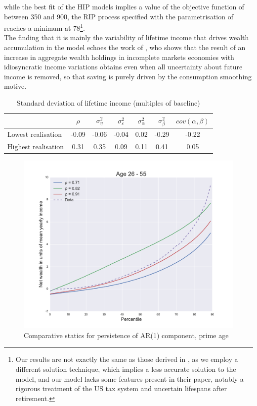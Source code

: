 while the best fit of the HIP models implies a value of the objective function
of between 350 and 900, the RIP process specified with the parametrisation of
\citet{HintermaierKoeniger2011} reaches a minimum at 78\footnote{Our results are
not exactly the same as those derived in \citet{HintermaierKoeniger2011}, as we 
employ a different solution technique, which implies a less accurate solution to 
the model, and our model lacks some features present in their paper, notably a
rigorous treatment of the US tax system and uncertain lifespans after retirement.}.\\
The finding that it is mainly the variability of lifetime income that drives
wealth accumulation in the model echoes the work of \citet{Floden2008}, who 
shows that the \citet{Aiyagari1994} result of an increase in aggregate wealth 
holdings in incomplete markets economies with idiosyncratic income variations
obtains even when all uncertainty about future income is removed, so that 
saving is purely driven by the consumption smoothing motive. 

\begin{table}
\begin{tabular}{l|cccccc}
                    & $\rho$ & $\sigma^2_{\eta}$ & $\sigma^2_{\varepsilon}$ & $\sigma^2_{\alpha}$ & $\sigma^2_{\beta}$ & $cov(\alpha,\beta)$ \\
                    \hline 
Lowest realisation  & -0.09   &   -0.06           &   -0.04                  &     0.02            &     -0.29          &    -0.22   \\
Highest realisation &  0.31   &    0.35           &    0.09                  &     0.11            &      0.41          &     0.05   \\
\end{tabular}
\caption{Standard deviation of lifetime income (multiples of baseline)}
\label{tab:lifetime_dispersion}
\end{table}


\begin{figure}
\includegraphics[width=\columnwidth]{comp_stat_rho}
\caption{Comparative statics for persistence of AR(1) component, prime age}
\label{fig:comp_stat_rho}
\end{figure}

